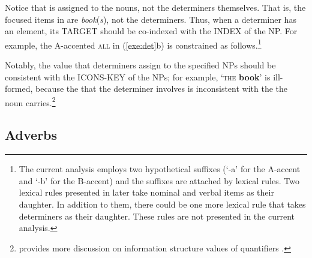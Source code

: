 
\noindent Notice that  is assigned to the nouns, not the
determiners themselves. That is, the focused items in 
are \textit{book}(\textit{s}), not the determiners.  Thus, when a
determiner has an  element, its TARGET should be co-indexed
with the INDEX of the NP.  For example, the
A-accented \textsc{all} in (\ref{exe:det}b) is constrained as
follows.\footnote{The current analysis employs two hypothetical
  suffixes (`-a' for the A-accent and `-b' for the B-accent) and the
  suffixes are attached by lexical rules. Two lexical rules presented
  in  later take nominal and verbal items as
  their daughter. In addition to them, there could be one
  more lexical rule that takes determiners as their daughter. These
  rules are not presented in the current analysis.}



\noindent Notably, the  value that determiners assign to
the specified NPs should be consistent with the ICONS-KEY of the
NPs; for example, `\textsc{the} \textbf{book}' is
ill-formed, because the  that the determiner
involves is inconsistent with the  the noun
carries.\footnote{ provides more discussion
  on information structure values of
  quantifiers .}




\subsection{Adverbs}
\label{10:ssec:adverbs}


